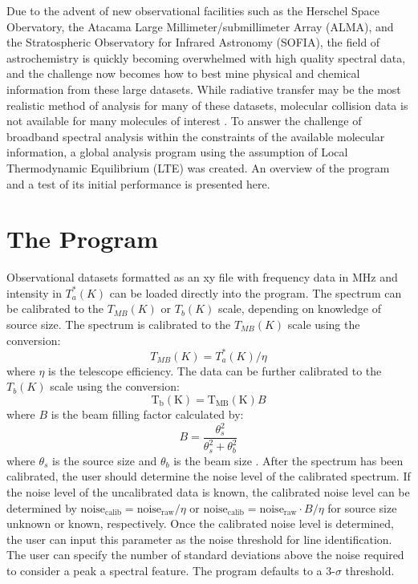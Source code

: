 \documentclass[11pt,twoside]{article}
\begin{document}
Due to the advent of new observational facilities such as the Herschel Space Obervatory, the Atacama Large Millimeter/submillimeter Array (ALMA), and the Stratospheric Observatory for Infrared Astronomy (SOFIA), the field of astrochemistry is quickly becoming overwhelmed with high quality spectral data, and the challenge now becomes how to best mine physical and chemical information from these large datasets.  While radiative transfer may be the most realistic method of analysis for many of these datasets, molecular collision data is not available for many molecules of interest \citep{vanderTak_2007}.  To answer the challenge of broadband spectral analysis within the constraints of the available molecular information, a global analysis program using the assumption of Local Thermodynamic Equilibrium (LTE) was created.  An overview of the program and a test of its initial performance is presented here.

\section{The Program}
Observational datasets formatted as an xy file with frequency data in MHz and intensity in $T_a^*(K)$ can be loaded directly into the program.  The spectrum can be calibrated to the $T_{MB}(K)$ or $T_b(K)$ scale, depending on knowledge of source size.  The spectrum is calibrated to the $T_{MB}(K)$ scale using the conversion:
$$T_{MB}(K) = T_a^*(K)/\eta$$
where $\eta$ is the telescope efficiency.  The data can be further calibrated to the $T_b(K)$ scale using the conversion:
$$\text{T}_\text{b}(\text{K}) = \text{T}_\text{MB}(\text{K}) B$$
where $B$ is the beam filling factor calculated by:
$$B = \frac{\theta_s^2}{\theta_s^2 + \theta_b^2}$$
where $\theta_s$ is the source size and $\theta_b$ is the beam size \citep{NummelinAA_1998}.
After the spectrum has been calibrated, the user should determine the noise level of the calibrated spectrum.  If the noise level of the uncalibrated data is known, the calibrated noise level can be determined by $\text{noise}_\text{calib} = \text{noise}_\text{raw} /\eta$ or $\text{noise}_\text{calib} = \text{noise}_\text{raw} \cdot B/\eta$ for source size unknown or known, respectively.  Once the calibrated noise level is determined, the user can input this parameter as the noise threshold for line identification.  The user can specify the number of standard deviations above the noise required to consider a peak a spectral feature.  The program defaults to a $3$-$\sigma$ threshold.
\end{document}
